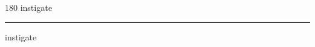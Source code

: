 
\begin{frame}
\begin{center}
\begin{turn}{180}
{\fontsize{2.5cm}{1em}\selectfont instigate}
\end{turn}
\vspace{1em}\par  
\hrule
\vspace{1em}\par  
{\fontsize{2.5cm}{1em}\selectfont instigate}
\end{center}
\end{frame}

